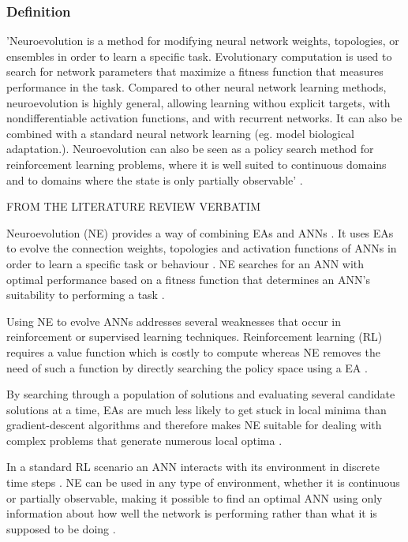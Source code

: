 \subsubsection{Definition}
'Neuroevolution is a method for modifying neural network weights, topologies, or ensembles in order to learn a specific task. Evolutionary computation is used to search for network parameters that maximize a fitness function that measures performance in the task. Compared to other neural network learning methods, neuroevolution is highly general, allowing learning withou explicit targets, with nondifferentiable activation functions, and with recurrent networks. It can also be combined with a standard neural network learning (eg. model biological adaptation.). Neuroevolution can also be seen as a policy search method for reinforcement learning problems, where it is well suited to continuous domains and to domains where the state is only partially observable' \cite{Miikkulainen2010}.







FROM THE LITERATURE REVIEW VERBATIM


Neuroevolution (NE) provides a way of combining EAs and ANNs \cite{RefWorks:31}. It uses EAs to evolve the connection weights, topologies and activation functions of ANNs in order to learn a specific task or behaviour \cite{gomez1999solving}. NE searches for an ANN with optimal performance based on a fitness function that determines an ANN's suitability to performing a task \cite{RefWorks:31}.

Using NE to evolve ANNs addresses several weaknesses that occur in reinforcement or supervised learning techniques. Reinforcement learning (RL) requires a value function which is costly to compute whereas NE removes the need of such a function by directly searching the policy space using a EA \cite{RefWorks:32}.

By searching through a population of solutions and evaluating several candidate solutions at a time, EAs are much less likely to get stuck in local minima than gradient-descent algorithms and therefore makes NE suitable for dealing with complex problems that generate numerous local optima \cite{gomez2001neuro,RefWorks:1}.

In a standard RL scenario an ANN interacts with its environment in discrete time steps \cite{igel2003neuroevolution}. NE can be used in any type of environment, whether it is continuous or partially observable, making it possible to find an optimal ANN using only information about how well the network is performing rather than what it is supposed to be doing \cite{Miikkulainen:2010:ENN:1830761.1830902}.

